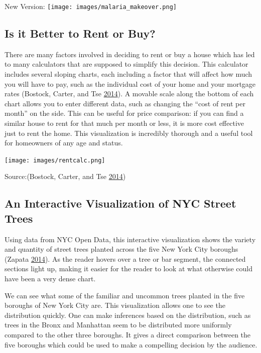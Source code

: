 \documentclass[]{book}
\begin{document}
New Version: \texttt{[image: images/malaria\_makeover.png]}

\hypertarget{is-it-better-to-rent-or-buy}{%
\subsection{Is it Better to Rent or Buy?}\label{is-it-better-to-rent-or-buy}}

There are many factors involved in deciding to rent or buy a house which has led to many calculators that are supposed to simplify this decision. This calculator includes several sloping charts, each including a factor that will affect how much you will have to pay, such as the individual cost of your home and your mortgage rates (Bostock, Carter, and Tse \protect\hyperlink{ref-rent_or_buy}{2014}). A movable scale along the bottom of each chart allows you to enter different data, such as changing the ``cost of rent per month'' on the side. This can be useful for price comparison: if you can find a similar house to rent for that much per month or less, it is more cost effective just to rent the home. This visualization is incredibly thorough and a useful tool for homeowners of any age and status.

\texttt{[image: images/rentcalc.png]}

Source:(Bostock, Carter, and Tse \protect\hyperlink{ref-rent_or_buy}{2014})

\hypertarget{an-interactive-visualization-of-nyc-street-trees}{%
\subsection{An Interactive Visualization of NYC Street Trees}\label{an-interactive-visualization-of-nyc-street-trees}}

Using data from NYC Open Data, this interactive visualization shows the variety and quantity of street trees planted across the five New York City boroughs (Zapata \protect\hyperlink{ref-trees}{2014}). As the reader hovers over a tree or bar segment, the connected sections light up, making it easier for the reader to look at what otherwise could have been a very dense chart.

We can see what some of the familiar and uncommon trees planted in the five boroughs of New York City are. This visualization allows one to see the distribution quickly. One can make inferences based on the distribution, such as trees in the Bronx and Manhattan seem to be distributed more uniformly compared to the other three boroughs. It gives a direct comparison between the five boroughs which could be used to make a compelling decision by the audience.
\end{document}
